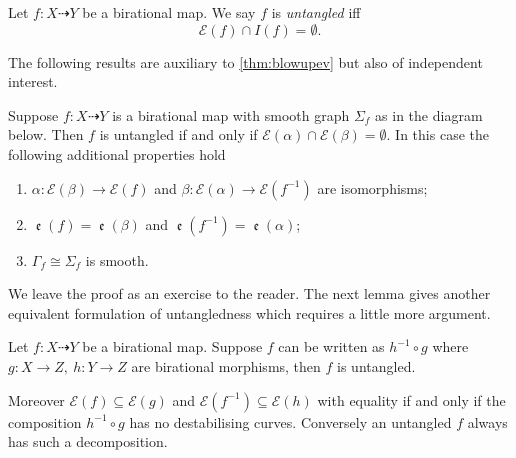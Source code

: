 \documentclass[11pt, final]{amsart}
\newcommand{\dashto}{\dashrightarrow}
\newcommand{\E}{\mathcal{E}}
\newcommand{\emp}{\emptyset}
\newcommand{\sgraph}{\Sigma}
\newcommand{\nice}{untangled}
\DeclareMathOperator{\comp}{\mathfrak e}
\begin{document}
\begin{defn}
 Let $f : X \dashto Y$ be a birational map. We say $f$ is \emph{\nice{}} iff \[\E(f) \cap I(f) = \emp.\]
\end{defn}

The following results are auxiliary to \autoref{thm:blowupev} but also of independent interest.

\begin{prop}\label{prop:curveex}
 Suppose $f : X \dashto Y$ is a birational map with smooth graph $\sgraph_{\!f}$ as in the diagram below. Then $f$ is \nice{} if and only if $\E(\alpha) \cap \E(\beta) = \emp$. In this case the following additional properties hold
%
\begin{enumerate}[ref=\emph{(\alph*)}, label=\emph{(\alph*)}]
\item $\alpha : \E(\beta) \to \E(f)$ and $\beta : \E(\alpha) \to \E(f^{-1})$ are isomorphisms;
 \item $\comp(f) = \comp(\beta)$ and $\comp(f^{-1}) = \comp(\alpha)$;
  \item $\Gamma_{\!f} \cong \sgraph_{\!f}$ is smooth.
\end{enumerate}
  \begin{center}
\end{center}
\end{prop}
%
We leave the proof as an exercise to the reader. The next lemma gives another equivalent formulation of \nice{}ness which requires a little more argument.

\begin{lem}\label{lem:untanglingcomp}
Let $f : X \dashto Y$ be a birational map. Suppose $f$ can be written as $h^{-1} \circ g$ where $g : X \to Z,\ h : Y \to Z$ are birational morphisms, then $f$ is \nice{}.

Moreover $\E(f) \subseteq \E(g)$ and $\E(f^{-1}) \subseteq \E(h)$ with equality if and only if the composition $h^{-1} \circ g$ has no destabilising curves. Conversely an \nice{} $f$ always has such a decomposition.
\end{lem}
\end{document}
